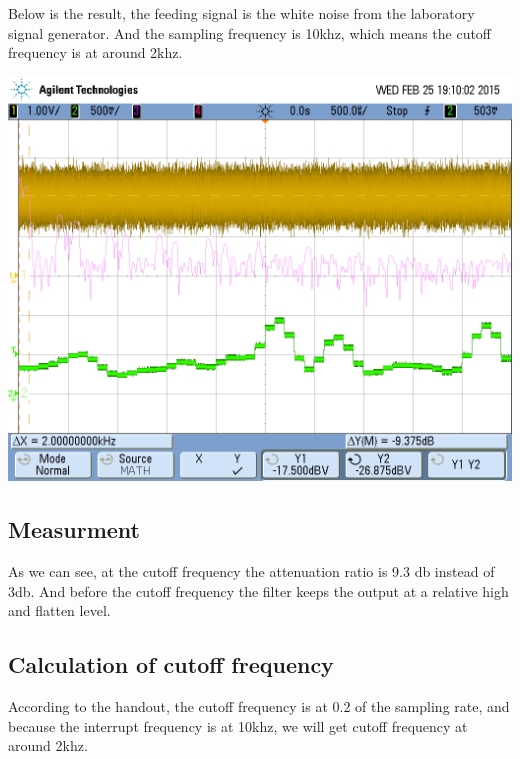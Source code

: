 \documentclass[11pt]{scrartcl}
\begin{document}
Below is the result, the feeding signal is the white noise from the laboratory signal generator. And the sampling frequency is 10khz, which means the cutoff frequency is at around 2khz.
\begin{center}
\begin{minipage}[t]{\linewidth}

{
\includegraphics[scale = 0.5]{re13.png}
}
\end{minipage}
\medskip
\end{center}
\subsection{Measurment}

As we can see, at the cutoff frequency the attenuation ratio is 9.3 db instead of 3db. And before the cutoff frequency the filter keeps the output at a relative high and flatten level.
\subsection{Calculation of cutoff frequency}

According to the handout, the cutoff frequency is at 0.2 of the sampling rate, and because the interrupt frequency is at 10khz, we will get cutoff frequency at around 2khz.
\end{document}
